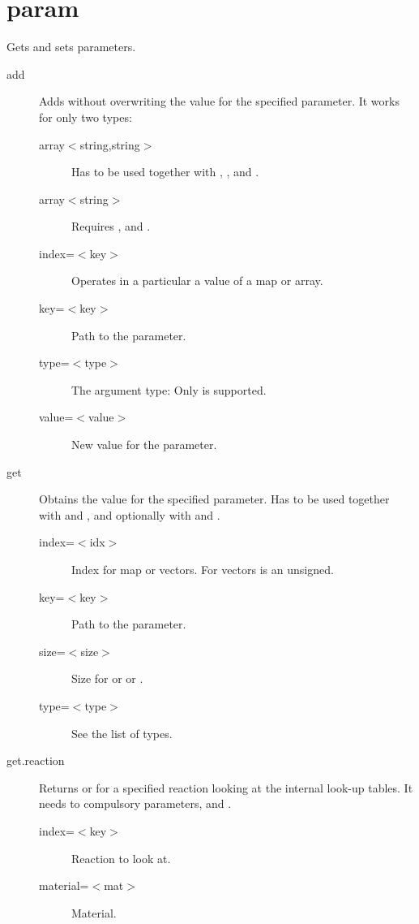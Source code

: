 \section{param}

Gets and sets parameters.

\begin{description}

\item[add] Adds without overwriting the value for the specified parameter. It works for only two types: 
\begin{description}
\item [array$<$string,string$>$] Has to be used together with , ,  and . 
\item [array$<$string$>$] Requires ,  and .
\end{description}

\begin{description}
\item[index=$<$key$>$] Operates in a particular a value of a map or array.
\item[key=$<$key$>$] Path to the parameter.
\item[type=$<$type$>$] The argument type: Only  is supported.
\item[value=$<$value$>$] New value for the parameter.
\end{description}

\item[get] Obtains the value for the specified parameter. Has to be used together with  and , and optionally with  and .
\begin{description}
\item[index=$<$idx$>$] Index for map or vectors. For vectors is an unsigned.
\item[key=$<$key$>$] Path to the parameter.
\item[size=$<$size$>$] Size for  or  or .
\item[type=$<$type$>$] See the list of types.
\end{description}

\item[get.reaction] Returns  or  for a specified reaction looking at the internal look-up tables. It needs to compulsory parameters,  and .
\begin{description}
\item[index=$<$key$>$] Reaction to look at.
\item[material=$<$mat$>$] Material.
\end{description}


\end{description}
